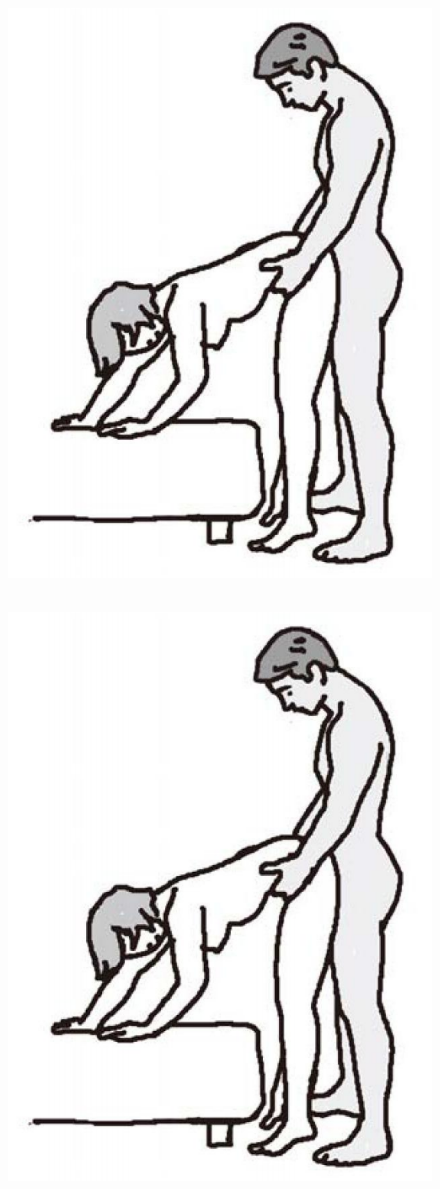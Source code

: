 \documentclass[12pt,UTF8]{ctexbook}
\begin{document}
\subsection{}

\begin{figure}[htbp]
	\centering
	\includegraphics[width=0.7\linewidth]{tw12}
	\caption{}
	\label{fig:1}
\end{figure}

\subsection{}

\begin{figure}[htbp]
	\centering
	\includegraphics[width=0.7\linewidth]{tw12}
	\caption{}
	\label{fig:1}
\end{figure}\subsection{}
\end{document}
